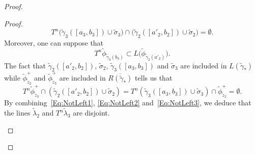 \begin{proof}
\begin{proof}
\begin{equation}\label{Eq:NotLeft2}
T^n\big(\tilde\gamma_3([a_3,b_3])\cup \tilde\sigma_3\big)\cap \big(\tilde\gamma_2([a'_2,b_2])\cup \tilde\sigma_2\big)=\emptyset.
\end{equation}
Moreover, one can suppose that
\[
T^n\tilde \phi_{\tilde\gamma_3(b_3)}\subset L\big(\tilde\phi_{\tilde\gamma_2(a'_2)}\big).
\]
The fact that $\tilde \gamma_2([a'_2,b_2])$, $\tilde \sigma_2$, $\tilde \gamma_3([a_3,b_3])$ and $\tilde \sigma_3$ are included in $L(\tilde\gamma_*)$ while $\tilde \phi^+_{\tilde z_2}$ and $\tilde \phi^+_{\tilde z_3}$ are included in $\overline {R(\tilde\gamma_*)}$ tells us that
\begin{equation}\label{Eq:NotLeft3}
T^n\tilde \phi^+_{\tilde z_3}\cap \left(\tilde\gamma_2([a'_2,b_2])\cup \tilde\sigma_2\right)= T^n\left(\tilde\gamma_3([a_3,b_3])\cup \tilde\sigma_3\right)\cap \tilde \phi^+_{\tilde z_2}=\emptyset.
\end{equation}
By combining~\eqref{Eq:NotLeft1}, \eqref{Eq:NotLeft2} and~\eqref{Eq:NotLeft3}, we deduce that the lines $\tilde\lambda_2$ and $T^n\tilde\lambda_3$ are disjoint.


\begin{figure}
\begin{center}
\end{center}
\end{figure}
\end{proof}
\end{proof}
